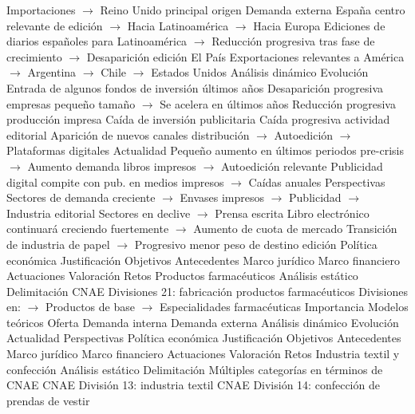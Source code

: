 \documentclass{nuevotema}
\begin{document}
\begin{esquemal}
				\4[] Importaciones
				\4[] $\to$ Reino Unido principal origen
				\4 Demanda externa
				\4[] España centro relevante de edición
				\4[] $\to$ Hacia Latinoamérica
				\4[] $\to$ Hacia Europa
				\4[] Ediciones de diarios españoles para Latinoamérica
				\4[] $\to$ Reducción progresiva tras fase de crecimiento
				\4[] $\to$ Desaparición edición El País
				\4[] Exportaciones relevantes a América
				\4[] $\to$ Argentina
				\4[] $\to$ Chile
				\4[] $\to$ Estados Unidos
			\3 Análisis dinámico
				\4 Evolución
				\4[] Entrada de algunos fondos de inversión últimos años
				\4[] Desaparición progresiva empresas pequeño tamaño
				\4[] $\to$ Se acelera en últimos años
				\4[] Reducción progresiva producción impresa
				\4[] Caída de inversión publicitaria
				\4[] Caída progresiva actividad editorial
				\4[] Aparición de nuevos canales distribución
				\4[] $\to$ Autoedición
				\4[] $\to$ Plataformas digitales
				\4 Actualidad
				\4[] Pequeño aumento en últimos periodos pre-crisis
				\4[] $\to$ Aumento demanda libros impresos
				\4[] $\to$ Autoedición relevante
				\4[] Publicidad digital compite con pub. en medios impresos
				\4[] $\to$ Caídas anuales
				\4 Perspectivas
				\4[] Sectores de demanda creciente
				\4[] $\to$ Envases impresos
				\4[] $\to$ Publicidad
				\4[] $\to$ Industria editorial
				\4[] Sectores en declive
				\4[] $\to$ Prensa escrita
				\4[] Libro electrónico continuará creciendo fuertemente
				\4[] $\to$ Aumento de cuota de mercado
				\4[] Transición de industria de papel
				\4[] $\to$ Progresivo menor peso de destino edición
			\3 Política económica
				\4 Justificación
				\4 Objetivos
				\4 Antecedentes
				\4 Marco jurídico
				\4 Marco financiero
				\4 Actuaciones
				\4 Valoración
				\4 Retos
		\2 Productos farmacéuticos
			\3 Análisis estático
				\4 Delimitación
				\4[] CNAE Divisiones 21: fabricación productos farmacéuticos
				\4[] Divisiones en:
				\4[] $\to$ Productos de base
				\4[] $\to$ Especialidades farmacéuticas
				\4 Importancia
				\4 Modelos teóricos
				\4 Oferta
				\4 Demanda interna
				\4 Demanda externa
			\3 Análisis dinámico
				\4 Evolución
				\4 Actualidad
				\4 Perspectivas
			\3 Política económica
				\4 Justificación
				\4 Objetivos
				\4 Antecedentes
				\4 Marco jurídico
				\4 Marco financiero
				\4 Actuaciones
				\4 Valoración
				\4 Retos
		\2 Industria textil y confección
			\3 Análisis estático
				\4 Delimitación
				\4[] Múltiples categorías en términos de CNAE
				\4[] CNAE División 13: industria textil
				\4[] CNAE División 14: confección de prendas de vestir

\end{esquemal}
\end{document}
